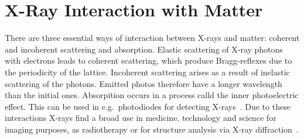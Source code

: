 
\section{X-Ray Interaction with Matter}\label{sec:Q2}

There are three essential ways of interaction between X-rays and matter: coherent and incoherent scattering and absorption. Elastic scattering of X-ray photons with electrons leads to coherent scattering, which produce Bragg-reflexes due to the periodicity of the lattice. Incoherent scattering arises as a result of inelastic scattering of the photons. Emitted photos therefore have a longer wavelength than the initial ones. Absorpition occurs in a process calld the inner photoelectric effect. This can be used in e.g.~photodiodes for detecting X-rays~\cite{Bohm.2021}. Due to these interactions X-rays find a broad use in medicine, technology and science for imaging purposes, as radiotherapy or for structure analysis via X-ray diffraction~\cite{Lewis.1997}.